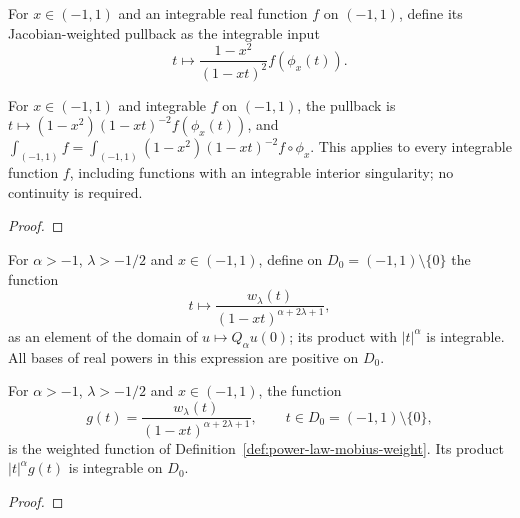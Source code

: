 \begin{supporting}
\begin{definition}
\label{def:power-law-mobius-pullback}
\leanok
For $x\in(-1,1)$ and an integrable real function $f$ on $(-1,1)$, define
its Jacobian-weighted pullback as the integrable input
\[
 t\longmapsto\frac{1-x^2}{(1-xt)^2}f(\phi_x(t)).
\]
\end{definition}
\begin{theorem}
\label{thm:power-law-mobius-pullback}
\leanok
For $x\in(-1,1)$ and integrable $f$ on $(-1,1)$, the pullback is $t\mapsto(1-x^2)(1-xt)^{-2}f(\phi_x(t))$, and
$\int_{(-1,1)}f=\int_{(-1,1)}(1-x^2)(1-xt)^{-2}f\circ\phi_x$.
This applies to every integrable function $f$, including functions with an integrable
interior singularity; no continuity is required.
\end{theorem}
\begin{proof}
\leanok
\end{proof}

\begin{definition}
\label{def:power-law-mobius-weight}
\leanok
For $\alpha>-1$, $\lambda>-1/2$ and $x\in(-1,1)$, define on
$D_0=(-1,1)\setminus\{0\}$ the function
\[
 t\longmapsto \frac{w_\lambda(t)}{(1-xt)^{\alpha+2\lambda+1}},
\]
as an element of the domain of $u\mapsto Q_\alpha u(0)$; its product with $|t|^\alpha$ is integrable.
All bases of real powers in this expression are positive on $D_0$.
\end{definition}
\begin{theorem}
\label{thm:power-law-mobius-weight}
\leanok
For $\alpha>-1$, $\lambda>-1/2$ and $x\in(-1,1)$, the function
\[
 g(t)=\frac{w_\lambda(t)}{(1-xt)^{\alpha+2\lambda+1}},
 \qquad t\in D_0=(-1,1)\setminus\{0\},
\]
is the weighted function of Definition~\ref{def:power-law-mobius-weight}.
Its product $|t|^\alpha g(t)$ is integrable on $D_0$.
\end{theorem}
\begin{proof}
\leanok
\end{proof}


\end{supporting}
